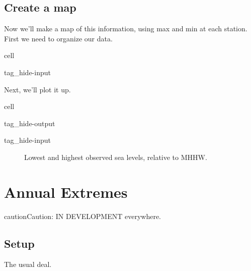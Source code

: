 \documentclass[letterpaper,10pt,english]{jupyterBook}
\begin{document}
\subsection{Create a map}
\label{\detokenize{notebooks/regional_and_local/SL_Rankings_annual:create-a-map}}\label{\detokenize{notebooks/regional_and_local/SL_Rankings_annual:sl-rankings-map}}
\sphinxAtStartPar
Now we’ll make a map of this information, using max and min at each station. First we need to organize our data.

\begin{sphinxuseclass}{cell}
\begin{sphinxuseclass}{tag_hide-input}
\end{sphinxuseclass}
\end{sphinxuseclass}
\sphinxAtStartPar
Next, we’ll plot it up.

\begin{sphinxuseclass}{cell}
\begin{sphinxuseclass}{tag_hide-output}
\begin{sphinxuseclass}{tag_hide-input}
\end{sphinxuseclass}
\end{sphinxuseclass}
\end{sphinxuseclass}
\begin{figure}[htbp]
\centering
\capstart

\noindent{}
\caption{Lowest and highest observed sea levels, relative to MHHW.}\label{\detokenize{notebooks/regional_and_local/SL_Rankings_annual:id1}}\end{figure}

\sphinxstepscope


\section{Annual Extremes}
\label{\detokenize{notebooks/regional_and_local/SL_Extremes_annual:annual-extremes}}\label{\detokenize{notebooks/regional_and_local/SL_Extremes_annual::doc}}
\begin{sphinxadmonition}{caution}{Caution:}
\sphinxAtStartPar
IN DEVELOPMENT everywhere.
\end{sphinxadmonition}


\subsection{Setup}
\label{\detokenize{notebooks/regional_and_local/SL_Extremes_annual:setup}}
\sphinxAtStartPar
The usual deal.
\end{document}
